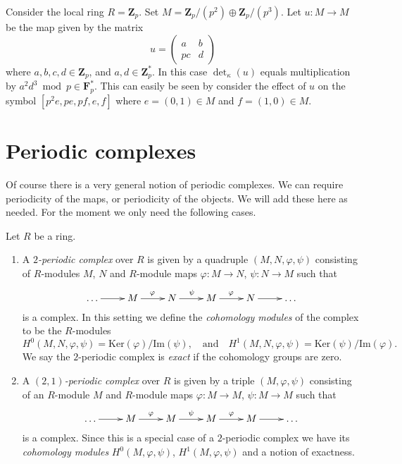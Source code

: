 \begin{example}
\label{example-determinant-map}
Consider the local ring $R = \mathbf{Z}_p$.
Set $M = \mathbf{Z}_p/(p^2) \oplus \mathbf{Z}_p/(p^3)$.
Let $u : M \to M$ be the map given by the matrix
$$
u =
\left(
\begin{matrix}
a & b \\
pc & d
\end{matrix}
\right)
$$
where $a, b, c, d \in \mathbf{Z}_p$, and $a, d \in \mathbf{Z}_p^*$.
In this case $\det_\kappa(u)$ equals multiplication by
$a^2d^3 \bmod p \in \mathbf{F}_p^*$. This can easily be seen
by consider the effect of $u$ on the symbol
$[p^2e, pe, pf, e, f]$ where $e = (0 , 1) \in M$ and
$f = (1, 0) \in M$.
\end{example}








\section{Periodic complexes}
\label{section-periodic-complexes}

\noindent
Of course there is a very general notion of periodic complexes.
We can require periodicity of the maps, or periodicity of the objects.
We will add these here as needed. For the moment we only need
the following cases.

\begin{definition}
\label{definition-periodic-complex}
Let $R$ be a ring.
\begin{enumerate}
\item A {\it $2$-periodic complex} over $R$ is given
by a quadruple $(M, N, \varphi, \psi)$ consisting of
$R$-modules $M$, $N$ and $R$-module maps $\varphi : M \to N$,
$\psi: N \to M$ such that
$$
\xymatrix{
\ldots \ar[r] &
M \ar[r]^\varphi &
N \ar[r]^\psi &
M \ar[r]^\varphi &
N \ar[r] & \ldots
}
$$
is a complex. In this setting we define the {\it cohomology modules}
of the complex to be the $R$-modules
$$
H^0(M, N, \varphi, \psi) = \text{Ker}(\varphi)/\text{Im}(\psi)
,\quad\text{and}\quad
H^1(M, N, \varphi, \psi) = \text{Ker}(\psi)/\text{Im}(\varphi).
$$
We say the $2$-periodic complex is {\it exact} if the cohomology
groups are zero.
\item A {\it $(2, 1)$-periodic complex} over $R$ is given
by a triple $(M, \varphi, \psi)$ consisting of an $R$-module $M$ and
$R$-module maps $\varphi : M \to M$, $\psi : M \to M$
such that
$$
\xymatrix{
\ldots \ar[r] &
M \ar[r]^\varphi &
M \ar[r]^\psi &
M \ar[r]^\varphi &
M \ar[r] & \ldots
}
$$
is a complex. Since this is a special case of a $2$-periodic complex
we have its {\it cohomology modules} $H^0(M, \varphi, \psi)$,
$H^1(M, \varphi, \psi)$ and a notion of exactness.
\end{enumerate}
\end{definition}

